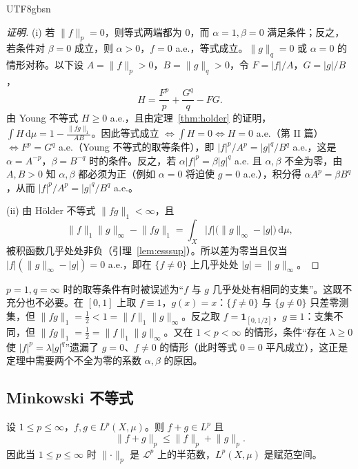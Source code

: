 \documentclass[11pt]{article}
\newcommand{\norm}[1]{\lVert #1\rVert}
\newcommand{\dmu}{\,\mathrm{d}\mu}
\newcommand{\ind}{\mathbf{1}}
\begin{document}
\begin{CJK*}{UTF8}{gbsn}
\begin{proof}[证明]
(i) 若 $\norm{f}_{p}=0$，则等式两端都为 $0$，而 $\alpha=1,\beta=0$ 满足条件；反之，若条件对 $\beta=0$ 成立，则 $\alpha>0$，$f=0$ a.e.，等式成立。$\norm{g}_{q}=0$ 或 $\alpha=0$ 的情形对称。以下设 $A=\norm{f}_{p}>0$，$B=\norm{g}_{q}>0$，令 $F=|f|/A$，$G=|g|/B$，
\[
H=\frac{F^{p}}{p}+\frac{G^{q}}{q}-FG .
\]
由 Young 不等式 $H\ge0$ a.e.，且由定理~\ref{thm:holder} 的证明，$\int H\dmu=1-\frac{\norm{fg}_{1}}{AB}$。因此等式成立 $\iff\int H=0\iff H=0$ a.e.（第 II 篇）$\iff F^{p}=G^{q}$ a.e.（Young 不等式的取等条件），即 $|f|^{p}/A^{p}=|g|^{q}/B^{q}$ a.e.，这是 $\alpha=A^{-p}$，$\beta=B^{-q}$ 时的条件。反之，若 $\alpha|f|^{p}=\beta|g|^{q}$ a.e. 且 $\alpha,\beta$ 不全为零，由 $A,B>0$ 知 $\alpha,\beta$ 都必须为正（例如 $\alpha=0$ 将迫使 $g=0$ a.e.），积分得 $\alpha A^{p}=\beta B^{q}$，从而 $|f|^{p}/A^{p}=|g|^{q}/B^{q}$ a.e.。

(ii) 由 Hölder 不等式 $\norm{fg}_{1}<\infty$，且
\[
\norm{f}_{1}\norm{g}_{\infty}-\norm{fg}_{1}=\int_{X}|f|\bigl(\norm{g}_{\infty}-|g|\bigr)\dmu ,
\]
被积函数几乎处处非负（引理~\ref{lem:esssup}）。所以差为零当且仅当 $|f|(\norm{g}_{\infty}-|g|)=0$ a.e.，即在 $\{f\ne0\}$ 上几乎处处 $|g|=\norm{g}_{\infty}$。
\end{proof}

\begin{example}\label{ex:holder-eq}
$p=1,q=\infty$ 时的取等条件有时被误述为“$f$ 与 $g$ 几乎处处有相同的支集”。这既不充分也不必要。在 $[0,1]$ 上取 $f\equiv1$，$g(x)=x$：$\{f\ne0\}$ 与 $\{g\ne0\}$ 只差零测集，但 $\norm{fg}_{1}=\tfrac12<1=\norm{f}_{1}\norm{g}_{\infty}$。反之取 $f=\ind_{[0,1/2]}$，$g\equiv1$：支集不同，但 $\norm{fg}_{1}=\tfrac12=\norm{f}_{1}\norm{g}_{\infty}$。又在 $1<p<\infty$ 的情形，条件“存在 $\lambda\ge0$ 使 $|f|^{p}=\lambda|g|^{q}$”遗漏了 $g=0$、$f\ne0$ 的情形（此时等式 $0=0$ 平凡成立），这正是定理中需要两个不全为零的系数 $\alpha,\beta$ 的原因。
\end{example}

\subsection{Minkowski 不等式}

\begin{theorem}\label{thm:minkowski}
设 $1\le p\le\infty$，$f,g\in L^{p}(X,\mu)$。则 $f+g\in L^{p}$ 且
\[
\norm{f+g}_{p}\le\norm{f}_{p}+\norm{g}_{p}.
\]
因此当 $1\le p\le\infty$ 时 $\norm{\cdot}_{p}$ 是 $\mathcal{L}^{p}$ 上的半范数，$L^{p}(X,\mu)$ 是赋范空间。
\end{theorem}


\end{CJK*}
\end{document}
